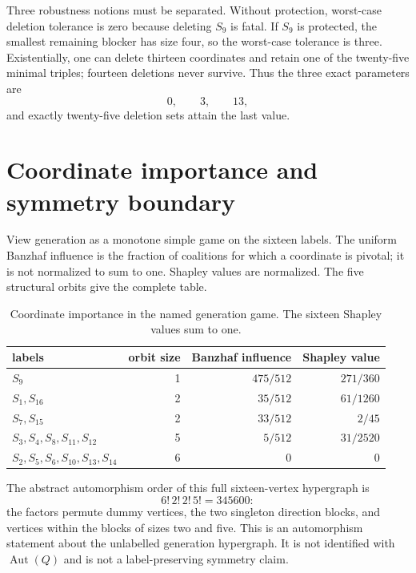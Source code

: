\documentclass[10pt]{article}
\begin{document}
Three robustness notions must be separated.  Without protection, worst-case
deletion tolerance is zero because deleting $S_9$ is fatal.  If $S_9$ is
protected, the smallest remaining blocker has size four, so the worst-case
tolerance is three.  Existentially, one can delete thirteen coordinates and
retain one of the twenty-five minimal triples; fourteen deletions never
survive.  Thus the three exact parameters are
\[
 0,\qquad3,\qquad13,
\]
and exactly twenty-five deletion sets attain the last value.

\section{Coordinate importance and symmetry boundary}
View generation as a monotone simple game on the sixteen labels.  The uniform
Banzhaf influence is the fraction of coalitions for which a coordinate is
pivotal; it is not normalized to sum to one.  Shapley values are normalized.
The five structural orbits give the complete table.

\begin{table}[htbp]
\centering
\small
\begin{tabular}{lrrr}
\toprule
labels&orbit size&Banzhaf influence&Shapley value\\
\midrule
$S_9$&1&$475/512$&$271/360$\\
$S_1,S_{16}$&2&$35/512$&$61/1260$\\
$S_7,S_{15}$&2&$33/512$&$2/45$\\
$S_3,S_4,S_8,S_{11},S_{12}$&5&$5/512$&$31/2520$\\
$S_2,S_5,S_6,S_{10},S_{13},S_{14}$&6&$0$&$0$\\
\bottomrule
\end{tabular}
\caption{Coordinate importance in the named generation game.  The sixteen
Shapley values sum to one.}
\label{tab:importance}
\end{table}

The abstract automorphism order of this full sixteen-vertex hypergraph is
\[
 6!\,2!\,2!\,5!=345600:
\]
the factors permute dummy vertices, the two singleton direction blocks, and
vertices within the blocks of sizes two and five.  This is an automorphism
statement about the unlabelled generation hypergraph.  It is not identified
with $\operatorname{Aut}(Q)$ and is not a label-preserving symmetry claim.
\end{document}
